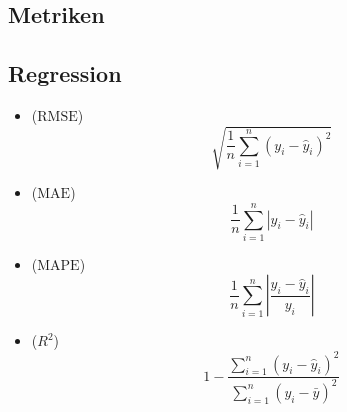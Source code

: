 \newpage


\begin{formelsammlung}

\section*{Metriken}
  \subsection*{Regression}
  \begin{mdframed}[style=exercise]
    \begin{itemize}[label={},left=0pt]
      \item {} (\( \text{RMSE} \)) 
      {\scriptsize \[ 
          \sqrt{\frac{1}{n} \sum_{i=1}^{n} (y_i - \hat{y}_i)^2}
      \]} \vspace{-1.5em} %
      \item {} (\( \text{MAE} \)) 
      {\scriptsize \[ 
          \frac{1}{n} \sum_{i=1}^{n} |y_i - \hat{y}_i|
      \]} \vspace{-1.5em}
      \item {} (\( \text{MAPE} \)) 
      {\scriptsize \[ 
          \frac{1}{n} \sum_{i=1}^{n} \left| \frac{y_i - \hat{y}_i}{y_i} \right|
      \]} \vspace{-1.5em}
      \item {} (\( R^2 \)) 
      {\scriptsize \[ 
        1 - \frac{\sum_{i=1}^{n} (y_i - \hat{y}_i)^2}{\sum_{i=1}^{n} (y_i - \bar{y})^2}
      \]} \vspace{-1.5em}
    \end{itemize}
  \end{mdframed}


\end{formelsammlung}
